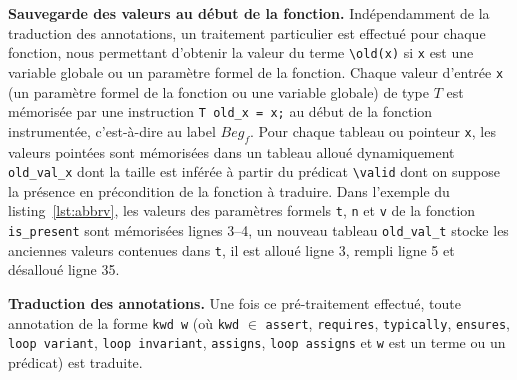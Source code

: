 \textbf{Sauvegarde des valeurs  au début de la fonction.}
Indépendamment de la traduction des annotations, un traitement particulier est
effectué pour chaque fonction, nous permettant d'obtenir la valeur
du terme \lstinline'\old(x)' si \lstinline'x' est une variable globale ou un
paramètre formel de la fonction.
Chaque valeur d'entrée \lstinline'x' (un paramètre formel de la fonction ou une
variable globale) de type $T$ est mémorisée par une instruction
\lstinline'T old_x = x;' au début de la fonction instrumentée, c'est-à-dire au
label $Beg_f$.
Pour chaque tableau ou pointeur \lstinline'x', les valeurs pointées sont
mémorisées dans un tableau alloué dynamiquement \lstinline'old_val_x' dont la
taille est inférée à partir du prédicat \lstinline'\valid' dont on suppose la
présence en précondition de la fonction à traduire.
Dans l'exemple du listing~\ref{lst:abbrv}, les valeurs des paramètres formels
\lstinline't', \lstinline'n' et \lstinline'v' de la fonction
\lstinline'is_present' sont mémorisées lignes 3--4, un
nouveau tableau \lstinline'old_val_t' stocke les anciennes valeurs contenues
dans \lstinline't', il est alloué ligne 3, rempli ligne 5 et désalloué ligne 35.

\textbf{Traduction des annotations.}
Une fois ce pré-traitement effectué, toute annotation \eacsl de la forme
\lstinline'kwd w' (où \lstinline'kwd' $\in$ \bopen \lstinline'assert',
\lstinline'requires', \lstinline'typically', \lstinline'ensures',
\lstinline'loop variant', \lstinline'loop invariant', \lstinline'assigns',
\lstinline'loop assigns' \bclose et \lstinline'w' est un terme ou un prédicat)
est traduite.





